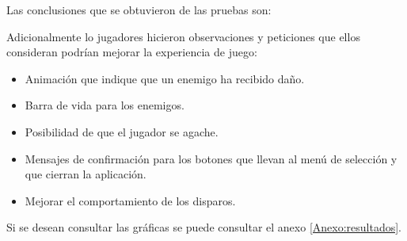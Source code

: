 Las conclusiones que se obtuvieron de las pruebas son:

Adicionalmente lo jugadores hicieron observaciones y peticiones que ellos
consideran podrían mejorar la experiencia de juego:
\begin{itemize}
        \item Animación que indique que un enemigo ha recibido daño.
        \item Barra de vida para los enemigos.
        \item Posibilidad de que el jugador se agache.
        \item Mensajes de confirmación para los botones que llevan al menú de selección 
        y que cierran la aplicación.
        \item Mejorar el comportamiento de los disparos.
\end{itemize}
Si se desean consultar las gráficas se puede consultar el anexo \ref{Anexo:resultados}.
